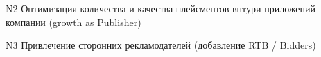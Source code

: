 \documentclass[times]{itmo-student-thesis}
\begin{document}
N2 Оптимизация количества и качества плейсментов внтури приложений компании (growth as Publisher)

N3 Привлечение сторонних рекламодателей (добавление RTB / Bidders)

\printmainbibliography


\appendix

                
\end{document}
